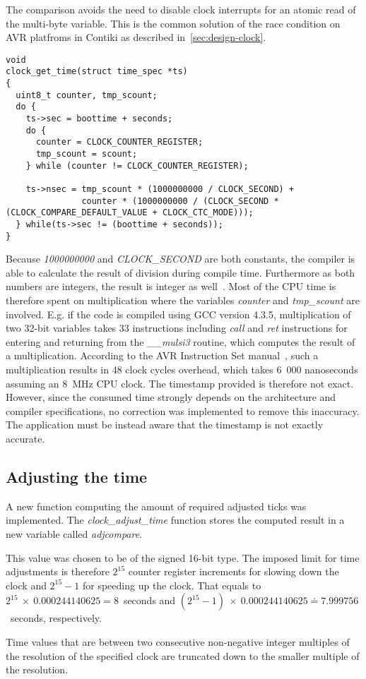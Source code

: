 The comparison avoids the need to disable clock interrupts for an atomic
read of the multi-byte variable.
This is the common solution of the race condition
on AVR platfroms in Contiki as described in~\ref{sec:design-clock}.
\begin{lstlisting}
void
clock_get_time(struct time_spec *ts)
{
  uint8_t counter, tmp_scount;
  do {
    ts->sec = boottime + seconds;
    do {
      counter = CLOCK_COUNTER_REGISTER;
      tmp_scount = scount;
    } while (counter != CLOCK_COUNTER_REGISTER);

    ts->nsec = tmp_scount * (1000000000 / CLOCK_SECOND) +
               counter * (1000000000 / (CLOCK_SECOND * (CLOCK_COMPARE_DEFAULT_VALUE + CLOCK_CTC_MODE)));
  } while(ts->sec != (boottime + seconds));
}
\end{lstlisting}
Because {\it{1000000000}} and {\it{CLOCK\_SECOND}} are both constants, the compiler is able to %
calculate the result of division during compile time.
Furthermore as both numbers are integers, the result is integer as well~\cite{c99}.
Most of the CPU time is therefore spent on multiplication where the variables
{\it{counter}} and {\it{tmp\_scount}} are involved.
E.g. if the code is compiled using GCC version 4.3.5,
multiplication of two 32-bit variables takes 33 instructions including {\it{call}} and {\it{ret}}
instructions for entering and returning from the {\it{\_\_mulsi3}} routine, which computes
the result of a multiplication.
According to the AVR Instruction Set manual~\cite{avr-instruction-set},
such a multiplication results in 48 clock cycles overhead,
which takes 6~000 nanoseconds assuming an 8~MHz CPU clock.
The timestamp provided is therefore not exact.
However, since the consumed time strongly depends on the architecture and compiler specifications,
no correction was implemented to remove this inaccuracy.
The application must be instead aware that the timestamp is not exactly accurate.

\subsection{Adjusting the time}
A new function computing the amount of required adjusted ticks was implemented.
The {\it{clock\_adjust\_time}} function stores the computed result in
a new variable called {\it{adjcompare}}.

This value was chosen to be of the signed 16-bit type.
The imposed limit for time adjustments is therefore $2^{15}$ counter register increments
for slowing down the clock and $2^{15}-1$ for speeding up the clock.
That equals to $2^{15}~\times~0.000244140625 = 8$~seconds
and $(2^{15} - 1)~\times~0.000244140625 \doteq 7.999756$~seconds, respectively.


Time values that are between two consecutive non-negative integer multiples
of the resolution of the specified clock are truncated down to the smaller multiple of the resolution.

